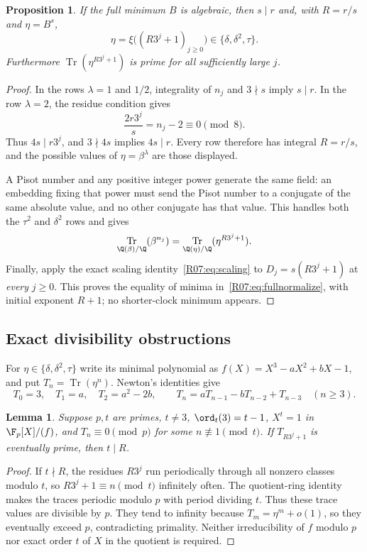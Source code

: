 \documentclass[11pt,a4paper]{article}
\newtheorem{lemma}[theorem]{Lemma}\newtheorem{proposition}[theorem]{Proposition}
\theoremstyle{definition}\newtheorem{definition}[theorem]{Definition}
\theoremstyle{remark}\newtheorem{remark}[theorem]{Remark}
\DeclareMathOperator{\Tr}{Tr}\DeclareMathOperator{\tr}{tr}\DeclareMathOperator{\Nm}{N}
\begin{document}
\begin{proposition}\label{R07:prop:normalize}
If the full minimum $B$ is algebraic, then $s\mid r$ and, with
$R=r/s$ and $\eta=B^s$,
\begin{equation}\label{R07:eq:fullnormalize}
 \boxed{\ \eta=\xi\bigl((R3^j+1)_{j\ge0}\bigr)
                       \in\{\delta,\delta^2,\tau\}.\ }
\end{equation}
Furthermore $\Tr(\eta^{R3^j+1})$ is prime for all sufficiently large $j$.
\end{proposition}
\begin{proof}
In the rows $\lambda=1$ and $1/2$, integrality of $n_j$ and
$3\nmid s$ imply $s\mid r$.
In the row $\lambda=2$, the residue condition gives
\[
                    \frac{2r3^j}{s}=n_j-2\equiv0\pmod8.
\]
Thus $4s\mid r3^j$, and $3\nmid4s$ implies $4s\mid r$.
Every row therefore has integral $R=r/s$, and the possible values
of $\eta=\beta^\lambda$ are those displayed.

A Pisot number and any positive integer power generate the same field:
an embedding fixing that power must send the Pisot number to a conjugate
of the same absolute value, and no other conjugate has that value.
This handles both the $\tau^2$ and $\delta^2$ rows and gives
\[
       \Tr_{\Q(\beta)/\Q}(\beta^{n_j})
           =\Tr_{\Q(\eta)/\Q}(\eta^{R3^j+1}).
\]
Finally, apply the exact scaling identity~\eqref{R07:eq:scaling} to
$D_j=s(R3^j+1)$ at \emph{every} $j\ge0$. This proves the equality
of minima in~\eqref{R07:eq:fullnormalize}, with initial exponent $R+1$;
no shorter-clock minimum appears.
\end{proof}

\subsection{Exact divisibility obstructions}

For $\eta\in\{\delta,\delta^2,\tau\}$ write its minimal polynomial
as $f(X)=X^3-aX^2+bX-1$, and put $T_n=\Tr(\eta^n)$.
Newton's identities give
\begin{equation}\label{R07:eq:recurrence}
 T_0=3,\quad T_1=a,\quad T_2=a^2-2b,\qquad
 T_n=aT_{n-1}-bT_{n-2}+T_{n-3}\quad(n\ge3).
\end{equation}

\begin{lemma}\label{R07:lem:ring}
Suppose $p,t$ are primes, $t\ne3$, $\ord_t(3)=t-1$,
$X^t=1$ in $\F_p[X]/(f)$, and $T_n\equiv0\pmod p$ for some
$n\not\equiv1\pmod t$. If $T_{R3^j+1}$ is eventually prime,
then $t\mid R$.
\end{lemma}
\begin{proof}
If $t\nmid R$, the residues $R3^j$ run periodically through all
nonzero classes modulo $t$, so $R3^j+1\equiv n\pmod t$ infinitely
often. The quotient-ring identity makes the traces periodic modulo $p$
with period dividing $t$. Thus these trace values are divisible by $p$.
They tend to infinity because $T_m=\eta^m+o(1)$, so they eventually
exceed $p$, contradicting primality. Neither irreducibility of $f$
modulo $p$ nor exact order $t$ of $X$ in the quotient is required.
\end{proof}
\end{document}
